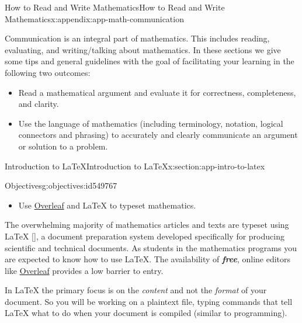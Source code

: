 \documentclass[oneside,10pt,]{book}
\newcommand{\xreffont}{\relax}
\newcommand{\alert}[1]{\textbf{\textit{#1}}}
\numberwithin{equation}{section}
\newenvironment{codedisplay}
{\VerbatimEnvironment\begin{center}\begin{lrbox}{\codedisplaybox}\begin{BVerbatim}}
{\end{BVerbatim}\end{lrbox}\usebox{\codedisplaybox}\end{center}}
\begin{document}
\begin{appendixptx}{How to Read and Write Mathematics}{}{How to Read and Write Mathematics}{}{}{x:appendix:app-math-communication}
\begin{introduction}{}%
Communication is an integral part of mathematics. This includes reading, evaluating, and writing\slash{}talking about mathematics. In these sections we give some tips and general guidelines with the goal of facilitating your learning in the following two outcomes:%
\begin{itemize}[label=\textbullet]
\item{}Read a mathematical argument and evaluate it for correctness, completeness, and clarity.%
\item{}Use the language of mathematics (including terminology, notation, logical connectors and phrasing) to accurately and clearly communicate an argument or solution to a problem.%
\end{itemize}
%
\end{introduction}%
%
%
\typeout{************************************************}
\typeout{************************************************}
%
\begin{sectionptx}{Introduction to \LaTeX{}}{}{Introduction to \LaTeX{}}{}{}{x:section:app-intro-to-latex}
\begin{objectives}{Objectives}{g:objectives:id549767}
%
\begin{itemize}[label=\textbullet]
\item{}Use \href{https://www.overleaf.com/}{Overleaf} and \LaTeX{} to typeset mathematics.%
\end{itemize}
\end{objectives}
The overwhelming majority of mathematics articles and texts are typeset using \LaTeX{} \hyperlink{x:biblio:bib-latex}{[{\xreffont 7}]}, a document preparation system developed specifically for producing scientific and technical documents. As students in the mathematics programs you are expected to know how to use \LaTeX{}. The availability of \alert{free}, online editors like \href{https://www.overleaf.com/}{Overleaf} provides a low barrier to entry.%
\par
In \LaTeX{} the primary focus is on the \emph{content} and not the \emph{format} of your document. So you will be working on a plaintext file, typing commands that tell \LaTeX{} what to do when your document is compiled (similar to programming).%
\end{sectionptx}
\end{appendixptx}
\end{document}
